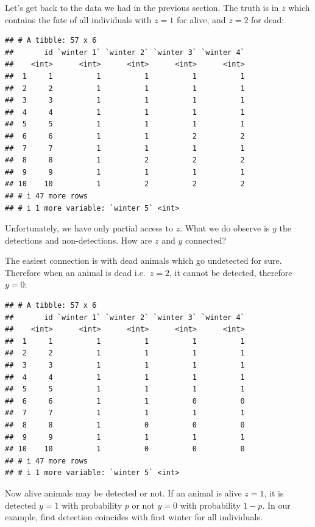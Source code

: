 \documentclass[
  12pt,
]{krantz}
\begin{document}
Let's get back to the data we had in the previous section. The truth is in \(z\) which contains the fate of all individuals with \(z = 1\) for alive, and \(z = 2\) for dead:

\begin{verbatim}
## # A tibble: 57 x 6
##       id `winter 1` `winter 2` `winter 3` `winter 4`
##    <int>      <int>      <int>      <int>      <int>
##  1     1          1          1          1          1
##  2     2          1          1          1          1
##  3     3          1          1          1          1
##  4     4          1          1          1          1
##  5     5          1          1          1          1
##  6     6          1          1          2          2
##  7     7          1          1          1          1
##  8     8          1          2          2          2
##  9     9          1          1          1          1
## 10    10          1          2          2          2
## # i 47 more rows
## # i 1 more variable: `winter 5` <int>
\end{verbatim}

Unfortunately, we have only partial access to \(z\). What we do observe is \(y\) the detections and non-detections. How are \(z\) and \(y\) connected?

The easiest connection is with dead animals which go undetected for sure. Therefore when an animal is dead i.e.~\(z = 2\), it cannot be detected, therefore \(y = 0\):

\begin{verbatim}
## # A tibble: 57 x 6
##       id `winter 1` `winter 2` `winter 3` `winter 4`
##    <int>      <int>      <int>      <int>      <int>
##  1     1          1          1          1          1
##  2     2          1          1          1          1
##  3     3          1          1          1          1
##  4     4          1          1          1          1
##  5     5          1          1          1          1
##  6     6          1          1          0          0
##  7     7          1          1          1          1
##  8     8          1          0          0          0
##  9     9          1          1          1          1
## 10    10          1          0          0          0
## # i 47 more rows
## # i 1 more variable: `winter 5` <int>
\end{verbatim}

Now alive animals may be detected or not. If an animal is alive \(z = 1\), it is detected \(y = 1\) with probability \(p\) or not \(y = 0\) with probability \(1-p\). In our example, first detection coincides with first winter for all individuals.
\end{document}
